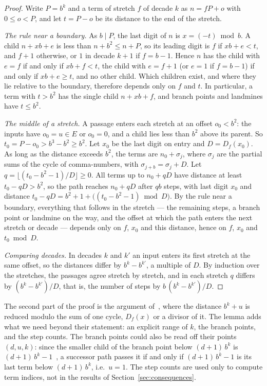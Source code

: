 \begin{proof}
  Write $P = b^k$ and a term of stretch $f$ of decade $k$ as $n = fP + o$ with $0 \le o < P$, and
  let $t = P - o$ be its distance to the end of the stretch.

  \emph{The rule near a boundary.} As $b \mid P$, the last digit of $n$ is $x = (-t) \bmod b$. A
  child $n + xb + e$ is less than $n + b^2 \le n + P$, so its leading digit is $f$ if $xb + e < t$,
  and $f + 1$ otherwise, or $1$ in decade $k + 1$ if $f = b - 1$. Hence $n$ has the child with
  $e = f$ if and only if $xb + f < t$, the child with $e = f + 1$ (or $e = 1$ if $f = b - 1$) if
  and only if $xb + e \ge t$, and no other child. Which children exist, and where they lie relative
  to the boundary, therefore depends only on $f$ and $t$. In particular, a term with $t > b^2$ has
  the single child $n + xb + f$, and branch points and landmines have $t \le b^2$.

  \emph{The middle of a stretch.} A passage enters each stretch at an offset $o_0 < b^2$: the
  inputs have $o_0 = u \in E$ or $o_0 = 0$, and a child lies less than $b^2$ above its parent.
  So $t_0 = P - o_0 > b^3 - b^2 \ge b^2$. Let $x_0$ be the last digit on entry and $D = D_f(x_0)$.
  As long as the distance exceeds $b^2$, the terms are $n_0 + \sigma_j$, where $\sigma_j$ are the
  partial sums of the cycle of comma-numbers, with $\sigma_{j + b} = \sigma_j + D$. Let
  $q = \lfloor (t_0 - b^2 - 1) / D \rfloor \ge 0$. All terms up to $n_0 + qD$ have distance at
  least $t_0 - qD > b^2$, so the path reaches $n_0 + qD$ after $qb$ steps, with last digit $x_0$ and
  distance $t_0 - qD = b^2 + 1 + \bigl((t_0 - b^2 - 1) \bmod D\bigr)$. By the rule near a boundary,
  everything that follows in the stretch --- the remaining steps, a branch point or landmine on the
  way, and the offset at which the path enters the next stretch or decade --- depends only on $f$,
  $x_0$ and this distance, hence on $f$, $x_0$ and $t_0 \bmod D$.

  \emph{Comparing decades.} In decades $k$ and $k'$ an input enters its first stretch at the same
  offset, so the distances differ by $b^k - b^{k'}$, a multiple of $D$. By induction over the
  stretches, the passages agree stretch by stretch, and in each stretch $q$ differs by
  $(b^k - b^{k'}) / D$, that is, the number of steps by $b\,(b^k - b^{k'}) / D$.
\end{proof}

The second part of the proof is the argument of~\cite[Proposition~8]{dbts}, where the distance
$b^k + u$ is reduced modulo the sum of one cycle, $D_f(x)$ or a divisor of it. The lemma adds what we
need beyond their statement: an explicit range of $k$, the branch points, and the step counts. The
branch points could also be read off their points $(d, u, k)$: since the smaller child of the branch
point below $(d+1)\,b^k$ is $(d+1)\,b^k - 1$~\cite[Theorem~5.2]{comma}, a successor path passes it if
and only if $(d+1)\,b^k - 1$ is its last term below $(d+1)\,b^k$, i.e.\ $u = 1$. The step counts are
used only to compute term indices, not in the results of Section~\ref{sec:consequences}.

